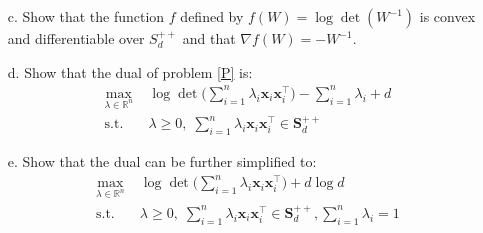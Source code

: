 \documentclass[11pt]{article}
\theoremstyle{remark}
\newcommand{\R}{\mathbb{R}}                     %
\newcommand{\bx}{\mathbf{x}}
\begin{document}
\begin{itemize}
    \item[c.] Show that the function $f$ defined by $f(W) = \log\det(W^{-1})$
        is convex and differentiable over $S_d^{++}$ and that $\nabla f(W)
        = -W^{-1}$.
    \item[d.] Show that the dual of problem \eqref{P} is:
        \begin{displaymath}
            \begin{split}
            \max_{\lambda\in\R^n}&\;
            \log\det\Bigg(\sum_{i=1}^n\lambda_i\bx_i\bx_i^\intercal\Bigg)
            - \sum_{i=1}^n \lambda_i + d\\
            \mathrm{s.t.}&\; \lambda\geq 0,\; \sum_{i=1}^n \lambda_i
            \bx_i\bx_i^\intercal\in\mathbf{S}_d^{++}
        \end{split}
        \end{displaymath}
    \item[e.] Show that the dual can be further simplified to:
        \begin{equation}\label{d2}
            \begin{split}
            \max_{\lambda\in\R^n}&\;
            \log\det\Bigg(\sum_{i=1}^n\lambda_i\bx_i\bx_i^\intercal\Bigg)
            +d\log d\\
            \mathrm{s.t.}&\; \lambda\geq 0,\; \sum_{i=1}^n \lambda_i
            \bx_i\bx_i^\intercal\in\mathbf{S}_d^{++}, \sum_{i=1}^n \lambda_i = 1
        \end{split}
        \end{equation}
\end{itemize}
\end{document}
